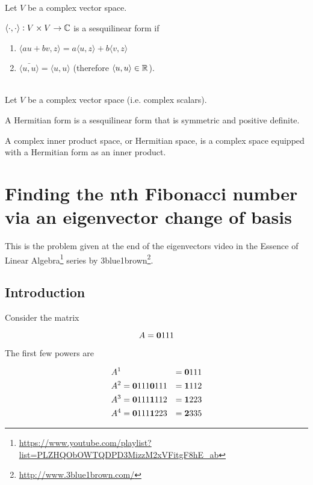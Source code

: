 \begin{definition*}
  Let $V$ be a complex vector space.

  $\langle \cdot, \cdot \rangle:V \times V \to \mathbb{C}$ is a sesquilinear form if
  \begin{enumerate}
  \item $\langle au + bv, z \rangle = a\langle u, z \rangle + b\langle v, z \rangle$
  \item $\bar{\langle u, u \rangle} = \langle u, u \rangle$ (therefore
    $\langle u, u \rangle \in \mathbb{R}$).
  \end{enumerate}
\end{definition*}


\begin{definition*}~\\
  Let $V$ be a complex vector space (i.e. complex scalars).

  A Hermitian form is a sesquilinear form that is symmetric and positive definite.

  A complex inner product space, or Hermitian space, is a complex space equipped with a Hermitian
  form as an inner product.
\end{definition*}


\section{Finding the nth Fibonacci number via an eigenvector change of basis}


This is the problem given at the end of the eigenvectors video in the
Essence of Linear Algebra\footnote{\url{https://www.youtube.com/playlist?list=PLZHQObOWTQDPD3MizzM2xVFitgF8hE_ab}}
series by 3blue1brown\footnote{\url{http://www.3blue1brown.com/}}.


\subsection*{Introduction}

Consider the matrix

$$
A = \mathbf{0}{1}
        {1}{1}
$$

The first few powers are

\begin{align*}
&A^{1} &= \mathbf{0}{1}
              {1}{1}
\\
&A^{2} = \mathbf{0}{1}
             {1}{1} \mathbf{0}{1}
                        {1}{1} &= \mathbf{1}{1}
                                      {1}{2}
\\
&A^{3} = \mathbf{0}{1}
             {1}{1} \mathbf{1}{1}
                        {1}{2} &= \mathbf{1}{2}
                                      {2}{3}
\\
&A^{4} = \mathbf{0}{1}
             {1}{1} \mathbf{1}{2}
                        {2}{3} &= \mathbf{2}{3}
                                      {3}{5}
\end{align*}

